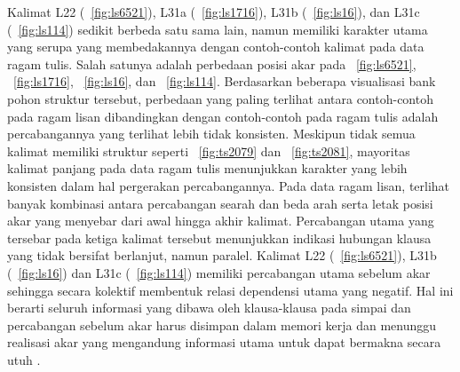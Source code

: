 Kalimat L22 (\pic~\ref{fig:ls6521}), L31a (\pic~\ref{fig:ls1716}), L31b (\pic~\ref{fig:ls16}), dan L31c (\pic~\ref{fig:ls114}) sedikit berbeda satu sama lain, namun memiliki karakter utama yang serupa yang membedakannya dengan contoh-contoh kalimat pada data ragam tulis. Salah satunya adalah perbedaan posisi akar pada \pic~\ref{fig:ls6521}, \pic~\ref{fig:ls1716}, \pic~\ref{fig:ls16}, dan \pic~\ref{fig:ls114}. Berdasarkan beberapa visualisasi bank pohon struktur tersebut, perbedaan yang paling terlihat antara contoh-contoh pada ragam lisan dibandingkan dengan contoh-contoh pada ragam tulis adalah percabangannya yang terlihat lebih tidak konsisten. Meskipun tidak semua kalimat memiliki struktur seperti \pic~\ref{fig:ts2079} dan \pic~\ref{fig:ts2081}, mayoritas kalimat panjang pada data ragam tulis menunjukkan karakter yang lebih konsisten dalam hal pergerakan percabangannya. Pada data ragam lisan, terlihat banyak kombinasi antara percabangan searah dan beda arah serta letak posisi akar yang menyebar dari awal hingga akhir kalimat. Percabangan utama yang tersebar pada ketiga kalimat tersebut menunjukkan indikasi hubungan klausa yang tidak bersifat berlanjut, namun paralel. Kalimat L22 (\pic~\ref{fig:ls6521}), L31b (\pic~\ref{fig:ls16}) dan L31c (\pic~\ref{fig:ls114}) memiliki percabangan utama sebelum akar sehingga secara kolektif membentuk relasi dependensi utama yang negatif. Hal ini berarti seluruh informasi yang dibawa oleh klausa-klausa pada simpai dan percabangan sebelum akar harus disimpan dalam memori kerja dan menunggu realisasi akar yang mengandung informasi utama untuk dapat bermakna secara utuh \citep{hawkins2014cross}.

